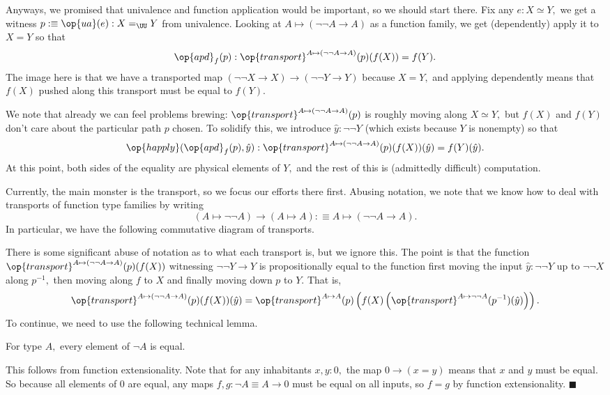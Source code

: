 Anyways, we promised that univalence and function application would be important, so we should start there. Fix any $e:X\simeq Y,$ we get a witness $p:\equiv\op{ua}(e):X=_\UU Y$ from univalence. Looking at $A\mapsto(\lnot\lnot A\to A)$ as a function family, we get (dependently) apply it to $X=Y$ so that
\[\op{apd}_f(p):\op{transport}^{A\mapsto(\lnot\lnot A\to A)}(p)(f(X))=f(Y).\]
The image here is that we have a transported map $(\lnot\lnot X\to X)\to(\lnot\lnot Y\to Y)$ because $X=Y,$ and applying dependently means that $f(X)$ pushed along this transport must be equal to $f(Y).$

We note that already we can feel problems brewing: $\op{transport}^{A\mapsto(\lnot\lnot A\to A)}(p)$ is roughly moving along $X\simeq Y,$ but $f(X)$ and $f(Y)$ don't care about the particular path $p$ chosen. To solidify this, we introduce $\hat y:\lnot\lnot Y$ (which exists because $Y$ is nonempty) so that
\[\op{happly}(\op{apd}_f(p),\hat y):\op{transport}^{A\mapsto(\lnot\lnot A\to A)}(p)(f(X))(\hat y)=f(Y)(\hat y).\]
At this point, both sides of the equality are physical elements of $Y,$ and the rest of this is (admittedly difficult) computation.

Currently, the main monster is the transport, so we focus our efforts there first. Abusing notation, we note that we know how to deal with transports of function type families by writing
\[(A\mapsto\lnot\lnot A)\to(A\mapsto A):\equiv A\mapsto(\lnot\lnot A\to A).\]
In particular, we have the following commutative diagram of transports.
\begin{center}
\end{center}
There is some significant abuse of notation as to what each transport is, but we ignore this. The point is that the function $\op{transport}^{A\mapsto(\lnot\lnot A\to A)}(p)(f(X))$ witnessing $\lnot\lnot Y\to Y$ is propositionally equal to the function first moving the input $\hat y:\lnot\lnot Y$ up to $\lnot\lnot X$ along $p^{-1},$ then moving along $f$ to $X$ and finally moving down $p$ to $Y.$ That is,
\[\op{transport}^{A\mapsto(\lnot\lnot A\to A)}(p)(f(X))(\hat y)=\op{transport}^{A\mapsto A}(p)\left(f(X)\left(\op{transport}^{A\mapsto\lnot\lnot A}(p^{-1})(\hat y)\right)\right).\]
To continue, we need to use the following technical lemma.
\begin{lemma}
    For type $A,$ every element of $\lnot A$ is equal.
\end{lemma}
This follows from function extensionality. Note that for any inhabitants $x,y:0,$ the map $0\to(x=y)$ means that $x$ and $y$ must be equal. So because all elements of $0$ are equal, any maps $f,g:\lnot A\equiv A\to 0$ must be equal on all inputs, so $f=g$ by function extensionality. $\blacksquare$

